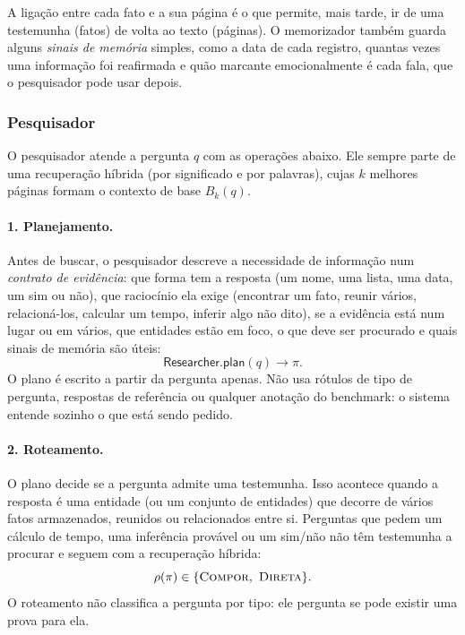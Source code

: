 \documentclass[11pt]{article}
\newcommand{\op}[1]{\textsf{#1}}
\begin{document}
A ligação entre cada fato e a sua página é o que permite, mais tarde, ir de
uma testemunha (fatos) de volta ao texto (páginas). O memorizador também
guarda alguns \emph{sinais de memória} simples, como a data de cada registro,
quantas vezes uma informação foi reafirmada e quão marcante emocionalmente é
cada fala, que o pesquisador pode usar depois.

\subsubsection{Pesquisador}

O pesquisador atende a pergunta $q$ com as operações abaixo. Ele sempre parte
de uma recuperação híbrida (por significado e por palavras), cujas $k$
melhores páginas formam o contexto de base $B_k(q)$.

\paragraph{1. Planejamento.} Antes de buscar, o pesquisador descreve a
necessidade de informação num \emph{contrato de evidência}: que forma tem a
resposta (um nome, uma lista, uma data, um sim ou não), que raciocínio ela
exige (encontrar um fato, reunir vários, relacioná-los, calcular um tempo,
inferir algo não dito), se a evidência está num lugar ou em vários, que
entidades estão em foco, o que deve ser procurado e quais sinais de memória
são úteis:
\begin{equation}
\op{Researcher.plan}(q)\rightarrow\pi.
\label{eq:plan}
\end{equation}
O plano é escrito a partir da pergunta apenas. Não usa rótulos de tipo de
pergunta, respostas de referência ou qualquer anotação do benchmark: o
sistema entende sozinho o que está sendo pedido.

\paragraph{2. Roteamento.} O plano decide se a pergunta admite uma
testemunha. Isso acontece quando a resposta é uma entidade (ou um conjunto de
entidades) que decorre de vários fatos armazenados, reunidos ou relacionados
entre si. Perguntas que pedem um cálculo de tempo, uma inferência provável ou
um sim/não não têm testemunha a procurar e seguem com a recuperação híbrida:
\begin{equation}
\rho(\pi)\in\{\textsc{Compor},\ \textsc{Direta}\}.
\label{eq:route}
\end{equation}
O roteamento não classifica a pergunta por tipo: ele pergunta se pode existir
uma prova para ela.
\end{document}
